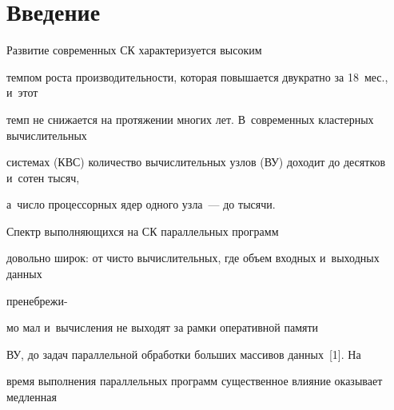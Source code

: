 




                  \vspace*{-6pt}













      \thispagestyle{headings}








\section{Введение}





      Развитие современных СК характеризуется высоким


темпом роста производительности, которая повышается двукратно за 18~мес., и~этот


темп не снижается на протяжении многих лет. В~современных кластерных вычислительных


сис\-те\-мах (КВС) количество вычислительных узлов (ВУ) доходит до десятков и~сотен тысяч,


а~чис\-ло процессорных ядер одного узла~--- до тысячи.





      Спектр выполняющихся на СК параллельных программ


довольно широк: от чисто вычислительных, где объем входных и~выходных данных


пренебрежи-\linebreak\vspace*{-12pt}





\pagebreak





\noindent


мо мал и~вычисления не выходят за рамки оперативной памяти


ВУ, до задач параллельной обработки больших массивов данных~[1]. На


время выполнения параллельных программ существенное влияние оказывает медленная


